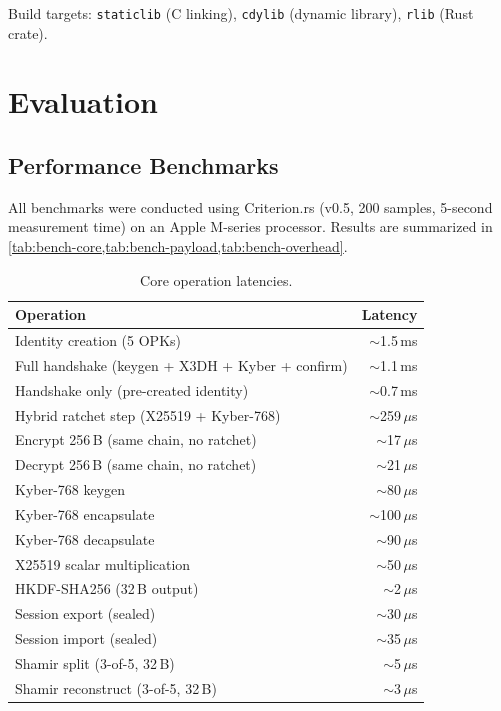 \documentclass[11pt,a4paper]{article}
\theoremstyle{definition}
\begin{document}
Build targets: \texttt{staticlib} (C linking), \texttt{cdylib} (dynamic library), \texttt{rlib} (Rust crate).


\section{Evaluation}\label{sec:evaluation}

\subsection{Performance Benchmarks}\label{sec:benchmarks}

All benchmarks were conducted using Criterion.rs (v0.5, 200 samples, 5-second measurement time) on an Apple M-series processor. Results are summarized in \cref{tab:bench-core,tab:bench-payload,tab:bench-overhead}.

\begin{table}[H]
\centering
\caption{Core operation latencies.}\label{tab:bench-core}
\small
\begin{tabular}{@{}lr@{}}
\toprule
Operation & Latency \\
\midrule
Identity creation (5 OPKs) & $\sim$1.5\,ms \\
Full handshake (keygen + X3DH + Kyber + confirm) & $\sim$1.1\,ms \\
Handshake only (pre-created identity) & $\sim$0.7\,ms \\
Hybrid ratchet step (X25519 + Kyber-768) & $\sim$259\,$\mu$s \\
Encrypt 256\,B (same chain, no ratchet) & $\sim$17\,$\mu$s \\
Decrypt 256\,B (same chain, no ratchet) & $\sim$21\,$\mu$s \\
\midrule
Kyber-768 keygen & $\sim$80\,$\mu$s \\
Kyber-768 encapsulate & $\sim$100\,$\mu$s \\
Kyber-768 decapsulate & $\sim$90\,$\mu$s \\
X25519 scalar multiplication & $\sim$50\,$\mu$s \\
HKDF-SHA256 (32\,B output) & $\sim$2\,$\mu$s \\
\midrule
Session export (sealed) & $\sim$30\,$\mu$s \\
Session import (sealed) & $\sim$35\,$\mu$s \\
Shamir split (3-of-5, 32\,B) & $\sim$5\,$\mu$s \\
Shamir reconstruct (3-of-5, 32\,B) & $\sim$3\,$\mu$s \\
\bottomrule
\end{tabular}
\end{table}
\end{document}

